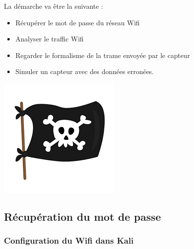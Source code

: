 \documentclass[french, 12pt]{article}%
\newcommand{\itemE}{\item[$\bullet$]}
\begin{document}
\begin{minipage}{0.55\linewidth}
La démarche va être la suivante : 
\begin{itemize}
\itemE Récupérer le mot de passe du réseau Wifi
\itemE Analyser le traffic Wifi
\itemE Regarder le formalisme de la trame envoyée par le capteur
\itemE Simuler un capteur avec des données erronées. 
\end{itemize}
\end{minipage}
\begin{minipage}{0.35\linewidth}
\begin{center}
\includegraphics[scale=0.5]{./ressource/logoHacker.png}
\end{center}
\end{minipage}





\subsection{Récupération du mot de passe}
\subsubsection{Configuration du Wifi dans Kali}
\end{document}
